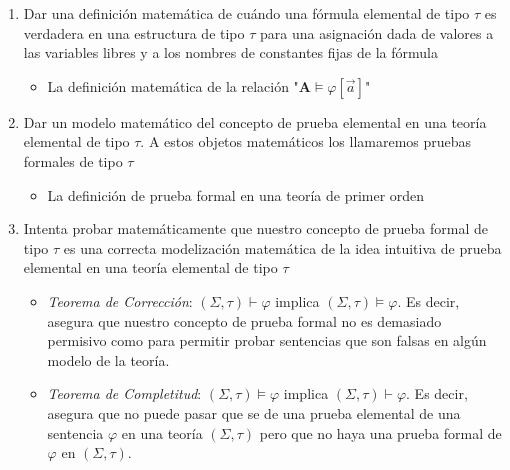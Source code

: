 \documentclass{article}
\begin{document}
\begin{enumerate}
\begin{itemize}
        \end{itemize}
  \item Dar una definición matemática de cuándo una fórmula elemental de tipo $\tau$ es verdadera en una estructura de tipo $\tau$ para una asignación dada de valores a las variables libres y a los nombres de constantes fijas de la fórmula
        \begin{itemize}
          \item La definición matemática de la relación "$\mathbf{A}\vDash\varphi[\vec{a}]$"
        \end{itemize}
  \item Dar un modelo matemático del concepto de prueba elemental en una teoría elemental de tipo $\tau$. A estos objetos matemáticos los llamaremos pruebas formales de tipo $\tau$
        \begin{itemize}
          \item La definición de prueba formal en una teoría de primer orden
        \end{itemize}
  \item Intenta probar matemáticamente que nuestro concepto de prueba formal de tipo $\tau$ es una correcta modelización matemática de la idea intuitiva de prueba elemental en una teoría elemental de tipo $\tau$
        \begin{itemize}
          \item \textit{Teorema de Corrección}: $(\Sigma,\tau)\vdash\varphi$ implica $(\Sigma,\tau)\vDash\varphi$. Es decir,  asegura que nuestro concepto de prueba formal no es demasiado permisivo como para permitir probar sentencias que son falsas en algún modelo de la teoría.
          \item \textit{Teorema de Completitud}: $(\Sigma,\tau)\vDash\varphi$ implica $(\Sigma,\tau)\vdash\varphi$. Es decir, asegura que no puede pasar que se de una prueba elemental de una sentencia $\varphi$ en una teoría $(\Sigma,\tau)$ pero que no haya una prueba formal de $\varphi$ en $(\Sigma,\tau)$.
        \end{itemize}
\end{enumerate}
\end{document}
